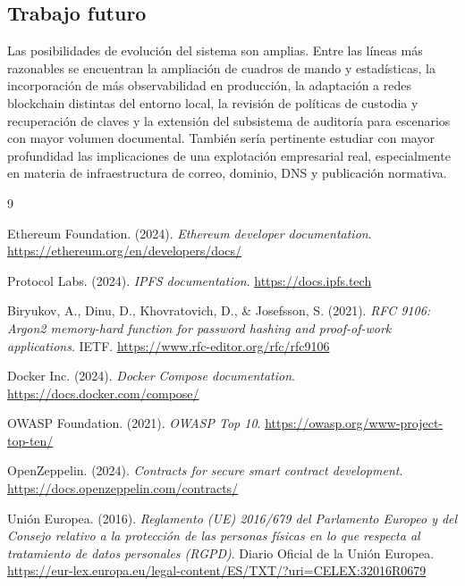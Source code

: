 \documentclass[11pt, a4paper]{article}
\begin{document}
\subsection{Trabajo futuro}

Las posibilidades de evolución del sistema son amplias. Entre las líneas más razonables se encuentran la ampliación de cuadros de mando y estadísticas, la incorporación de más observabilidad en producción, la adaptación a redes blockchain distintas del entorno local, la revisión de políticas de custodia y recuperación de claves y la extensión del subsistema de auditoría para escenarios con mayor volumen documental. También sería pertinente estudiar con mayor profundidad las implicaciones de una explotación empresarial real, especialmente en materia de infraestructura de correo, dominio, DNS y publicación normativa.

\begin{thebibliography}{9}

Ethereum Foundation. (2024). \textit{Ethereum developer documentation}. \url{https://ethereum.org/en/developers/docs/}

Protocol Labs. (2024). \textit{IPFS documentation}. \url{https://docs.ipfs.tech}

Biryukov, A., Dinu, D., Khovratovich, D., \& Josefsson, S. (2021). \textit{RFC 9106: Argon2 memory-hard function for password hashing and proof-of-work applications}. IETF. \url{https://www.rfc-editor.org/rfc/rfc9106}

Docker Inc. (2024). \textit{Docker Compose documentation}. \url{https://docs.docker.com/compose/}

OWASP Foundation. (2021). \textit{OWASP Top 10}. \url{https://owasp.org/www-project-top-ten/}

OpenZeppelin. (2024). \textit{Contracts for secure smart contract development}. \url{https://docs.openzeppelin.com/contracts/}

Unión Europea. (2016). \textit{Reglamento (UE) 2016/679 del Parlamento Europeo y del Consejo relativo a la protección de las personas físicas en lo que respecta al tratamiento de datos personales (RGPD)}. Diario Oficial de la Unión Europea. \url{https://eur-lex.europa.eu/legal-content/ES/TXT/?uri=CELEX:32016R0679}

\end{thebibliography}
\end{document}
